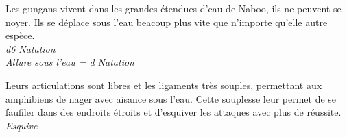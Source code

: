 \begin{description}[align=left]
\item [Aquatique] 			%
		Les gungans vivent dans les grandes étendues d'eau de Naboo, ils ne peuvent se noyer. Ils se déplace sous l'eau beacoup plus vite que n'importe qu'elle autre espèce.\\
		\emph{d6 Natation}\\
		\emph{Allure sous l'eau = d Natation}
\item [Mollusque] 			%
		Leurs articulations sont libres et les ligaments très souples, permettant aux amphibiens de nager avec aisance sous l'eau. Cette souplesse leur permet de se faufiler dans des endroits étroits et d'esquiver les attaques avec plus de réussite.\\
		\emph{Esquive}
\end{description}